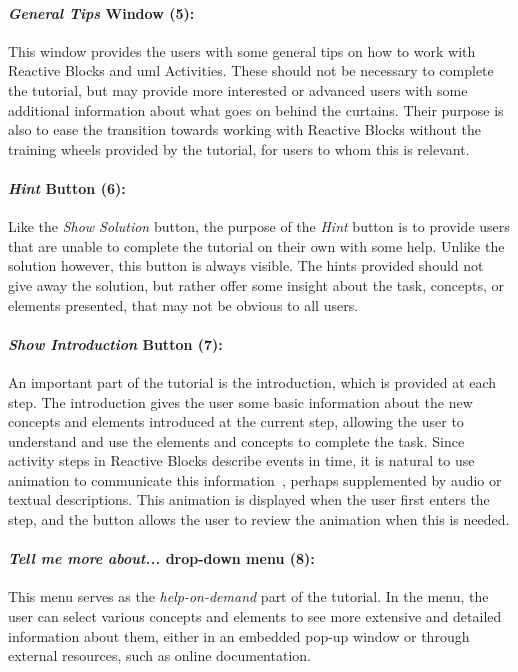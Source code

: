 \paragraph{\emph{General Tips} Window (5):} This window provides the users with some general tips on how to work with Reactive Blocks and \gls{uml} Activities. These should not be necessary to complete the tutorial, but may provide more interested or advanced users with some additional information about what goes on behind the curtains. Their purpose is also to ease the transition towards working with Reactive Blocks without the training wheels provided by the tutorial, for users to whom this is relevant.

\paragraph{\emph{Hint} Button (6):} Like the \emph{Show Solution}
button, the purpose of the \emph{Hint} button is to provide users that are unable to complete the tutorial on their own with some help. Unlike the solution however, this button is always visible. The hints provided should not give away the solution, but rather offer some insight about the task, concepts, or elements presented, that may not be obvious to all users.

\paragraph{\emph{Show Introduction} Button (7):} An important part of the tutorial is the introduction, which is provided at each step. The introduction gives the user some basic information about the new concepts and elements introduced at the current step, allowing the user to understand and use the elements and concepts to complete the task. Since activity steps in Reactive Blocks describe events in time, it is natural to use animation to communicate this information~\cite{morrison:animation}, perhaps supplemented by audio or textual descriptions. This animation is displayed when the user first enters the step, and the button allows the user to review the animation when this is needed.

\paragraph{\emph{Tell me more about...} drop-down menu (8):} This menu serves as the \emph{help-on-demand} part of the tutorial. In the menu, the user can select various concepts and elements to see more extensive and detailed information about them, either in an embedded pop-up window or through external resources, such as online documentation.

